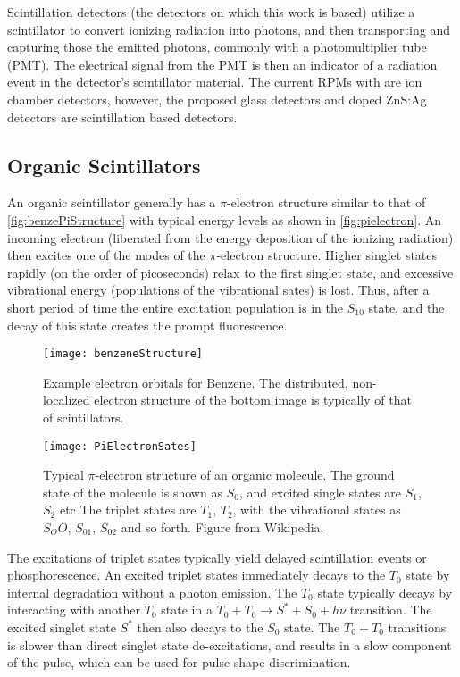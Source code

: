 Scintillation detectors (the detectors on which this work is based) utilize a scintillator to convert ionizing radiation into photons, and then transporting and capturing those the emitted photons, commonly with a photomultiplier tube (PMT).
The electrical signal from the PMT is then an indicator of a radiation event in the detector's scintillator material.
The current RPMs with  are ion chamber detectors, however, the proposed  glass detectors and  doped ZnS:Ag detectors are scintillation based detectors. 

\subsection{Organic Scintillators}
An organic scintillator generally has a $\pi$-electron structure similar to that of \autoref{fig:benzePiStructure} with typical energy levels as shown in \autoref{fig:pielectron}.
An incoming electron (liberated from the energy deposition of the ionizing radiation) then excites one of the modes of the $\pi$-electron structure.
Higher singlet states rapidly (on the order of picoseconds) relax to the first singlet state, and excessive vibrational energy (populations of the vibrational sates) is lost.
Thus, after a short period of time the entire excitation population is in the $S_10$ state, and the decay of this state creates the prompt fluorescence.
\begin{figure}
	\centering
	\texttt{[image: benzeneStructure]}
	\caption[Example orbitals for Benzene]{Example electron orbitals for Benzene.  The distributed, non-localized electron structure of the bottom image is typically of that of scintillators.}
	\label{fig:benzePiStructure}
\end{figure}
\begin{figure}
  \centering
  \texttt{[image: PiElectronSates]}
  \caption[$\pi$ Electron Structure]{Typical $\pi$-electron structure of an organic molecule. The ground state of the molecule is shown as $S_0$, and excited single states are $S_1$, $S_2$ etc The triplet states are $T_1$, $T_2$, with the vibrational states as $S_OO$, $S_01$, $S_02$ and so forth. Figure from Wikipedia.}
  \label{fig:pielectron}
\end{figure}
The excitations of triplet states typically yield delayed scintillation events or phosphorescence.
An excited triplet states immediately decays to the $T_0$ state by internal degradation without a photon emission.
The $T_0$ state typically decays by interacting with another $T_0$ state in a $T_0 + T_0 \to S^* + S_0 + h\nu$ transition.
The excited singlet state $S^*$ then also decays to the $S_0$ state.
The $T_0 + T_0$ transitions is slower than direct singlet state de-excitations, and results in a slow component of the pulse, which can be used for pulse shape discrimination.

